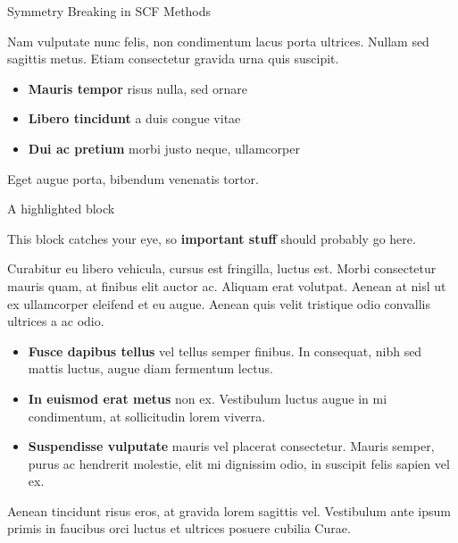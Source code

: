 \documentclass[final, xcolor={svgnames}]{beamer}
\newlength{\colwidth}
\begin{document}
\begin{frame}[t]
\begin{columns}[t]
\begin{column}{\colwidth}
	  \begin{block}{Symmetry Breaking in SCF Methods}
	
	    Nam vulputate nunc felis, non condimentum lacus porta ultrices. Nullam sed
	    sagittis metus. Etiam consectetur gravida urna quis suscipit.
	
	    \begin{itemize}
	      \item \textbf{Mauris tempor} risus nulla, sed ornare
	      \item \textbf{Libero tincidunt} a duis congue vitae
	      \item \textbf{Dui ac pretium} morbi justo neque, ullamcorper
	    \end{itemize}
	
	    Eget augue porta, bibendum venenatis tortor.
	
	  \end{block}
	
	  \begin{alertblock}{A highlighted block}
	
	    This block catches your eye, so \textbf{important stuff} should probably go
	    here.
	
	    Curabitur eu libero vehicula, cursus est fringilla, luctus est. Morbi
	    consectetur mauris quam, at finibus elit auctor ac. Aliquam erat volutpat.
	    Aenean at nisl ut ex ullamcorper eleifend et eu augue. Aenean quis velit
	    tristique odio convallis ultrices a ac odio.
	
	    \begin{itemize}
	      \item \textbf{Fusce dapibus tellus} vel tellus semper finibus. In
	        consequat, nibh sed mattis luctus, augue diam fermentum lectus.
	      \item \textbf{In euismod erat metus} non ex. Vestibulum luctus augue in
	        mi condimentum, at sollicitudin lorem viverra.
	      \item \textbf{Suspendisse vulputate} mauris vel placerat consectetur.
	        Mauris semper, purus ac hendrerit molestie, elit mi dignissim odio, in
	        suscipit felis sapien vel ex.
	    \end{itemize}
	
	    Aenean tincidunt risus eros, at gravida lorem sagittis vel. Vestibulum ante
	    ipsum primis in faucibus orci luctus et ultrices posuere cubilia Curae.
	
	  \end{alertblock}
	

\end{column}
\end{columns}
\end{frame}
\end{document}
